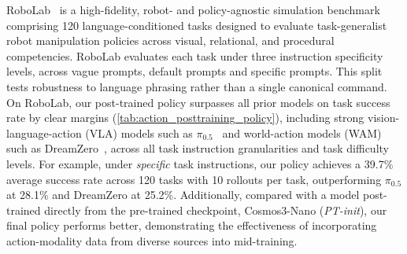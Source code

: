 \documentclass{llmxive}
\begin{document}
RoboLab~\citep{yang2026robolab} is a high-fidelity, robot- and policy-agnostic simulation benchmark comprising 120 language-conditioned tasks designed to evaluate task-generalist robot manipulation policies across visual, relational, and procedural competencies.
RoboLab evaluates each task under three instruction specificity levels, across vague prompts, default prompts and specific prompts.
This split tests robustness to language phrasing rather than a single canonical command.
On RoboLab, our post-trained policy surpasses all prior models on task success rate by clear margins (\cref{tab:action_posttraining_policy}), including strong vision-language-action (VLA) models such as $\pi_{0.5}$~\citep{pi05} and world-action models (WAM) such as DreamZero~\citep{ye2026dreamzero},
across all task instruction granularities and task difficulty levels.
For example, under \textit{specific} task instructions, our policy achieves a 39.7\% average success rate across 120 tasks with 10 rollouts per task, outperforming $\pi_{0.5}$ at 28.1\% and DreamZero at 25.2\%.
Additionally, compared with a model post-trained directly from the pre-trained checkpoint, Cosmos3-Nano (\textit{PT-init}), our final policy performs better, demonstrating the effectiveness of incorporating action-modality data from diverse sources into mid-training.
\end{document}
